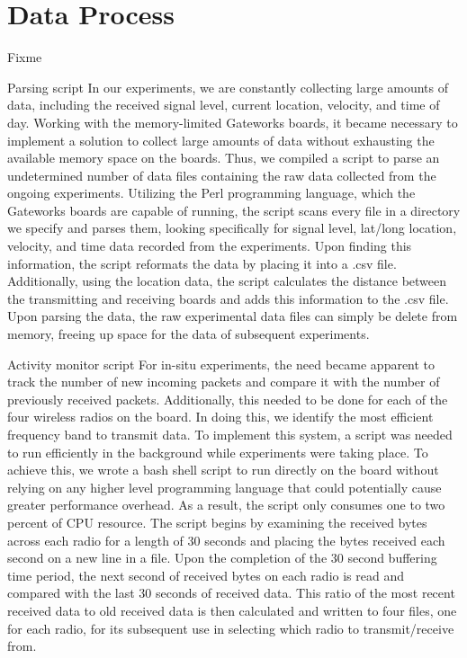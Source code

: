 \section{Data Process}
\label{sec:experiment}

Fixme


Parsing script
In our experiments, we are constantly collecting large amounts of data, including the received signal level, current location, velocity, and time of day. Working with the memory-limited Gateworks boards, it became necessary to implement a solution to collect large amounts of data without exhausting the available memory space on the boards. Thus, we compiled a script to parse an undetermined number of data files containing the raw data collected from the ongoing experiments. Utilizing the Perl programming language, which the Gateworks boards are capable of running, the script scans every file in a directory we specify and parses them, looking specifically for signal level, lat/long location, velocity, and time data recorded from the experiments. Upon finding this information, the script reformats the data by placing it into a .csv file. Additionally, using the location data, the script calculates the  distance between the transmitting and receiving boards and adds this information to the .csv file. Upon parsing the data, the raw experimental data files can simply be delete from memory, freeing up space for the data of subsequent experiments.

Activity monitor script
For in-situ experiments, the need became apparent to track the number of new incoming packets and compare it with the number of previously received packets. Additionally, this needed to be done for each of the four wireless radios on the board. In doing this, we identify the most efficient frequency band to transmit data. To implement this system, a script was needed to run efficiently in the background while experiments were taking place. To achieve this, we wrote a bash shell script to run directly on the board without relying on any higher level programming language that could potentially cause greater performance overhead. As a result, the script only consumes one to two percent of CPU resource. The script begins by examining the received bytes across each radio for a length of 30 seconds and placing the bytes received each second on a new line in a file. Upon the completion of the 30 second buffering time period, the next second of received bytes on each radio is read and compared with the last 30 seconds of received data. This ratio of the most recent received data to old received data is then calculated and written to four files, one for each radio, for its subsequent use in selecting which radio to transmit/receive from.

